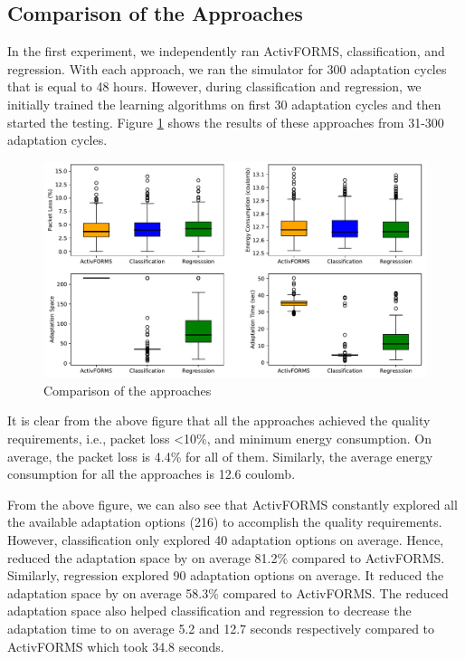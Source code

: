 \documentclass[a4paper,12pt]{article}
\begin{document}
\subsection{Comparison of the Approaches}
In the first experiment, we independently ran ActivFORMS, classification, and regression. With each approach, we ran the simulator for 300 adaptation cycles that is equal to 48 hours. However, during classification and regression, we initially trained the learning algorithms on first 30 adaptation cycles and then started the testing. Figure \ref{Comparison} shows the results of these approaches from 31-300 adaptation cycles.
\begin{figure}[H]
    \centering
    \includegraphics[keepaspectratio, width=\linewidth]{graphs/Comparison.pdf}
    \caption{Comparison of the approaches}
    \label{Comparison}
\end{figure}
It is clear from the above figure that all the approaches achieved the quality requirements, i.e., packet loss <10\%, and minimum energy consumption. On average, the packet loss is  4.4\% for all of them. Similarly, the average energy consumption for all the approaches is  12.6 coulomb.

From the above figure, we can also see that ActivFORMS constantly explored all the available adaptation options (216) to accomplish the quality requirements. However, classification only explored 40 adaptation options on average. Hence, reduced the adaptation space by on average 81.2\% compared to ActivFORMS. Similarly, regression explored 90 adaptation options on average. It reduced the adaptation space by on average 58.3\% compared to ActivFORMS. The reduced adaptation space also helped classification and regression to decrease the adaptation time to on average 5.2 and 12.7 seconds respectively compared to ActivFORMS which took 34.8 seconds.
\end{document}
